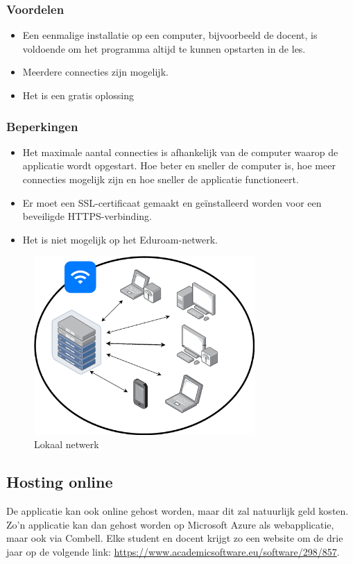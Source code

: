 \subsubsection{Voordelen}
\begin{itemize}
    \item Een eenmalige installatie op een computer, bijvoorbeeld de docent, is voldoende om het programma altijd te kunnen opstarten in de les.
    \item Meerdere connecties zijn mogelijk.
    \item Het is een gratis oplossing
\end{itemize}
\subsubsection{Beperkingen}
\begin{itemize}
    \item Het maximale aantal connecties is afhankelijk van de computer waarop de applicatie wordt opgestart. Hoe beter en sneller de computer is, hoe meer connecties mogelijk zijn en hoe sneller de applicatie functioneert.
    \item Er moet een SSL-certificaat gemaakt en geïnstalleerd worden voor een beveiligde HTTPS-verbinding.
    \item Het is niet mogelijk op het Eduroam-netwerk.
\end{itemize}

\begin{figure}
    \centering
    \includegraphics[width=0.75\textwidth]{./img/lokaal_netwerk}
    \caption{\label{fig:lokaal_netwerk} Lokaal netwerk}
\end{figure}

\subsection{Hosting online}
De applicatie kan ook online gehost worden, maar dit zal natuurlijk geld kosten. Zo'n applicatie kan dan gehost worden op Microsoft Azure als webapplicatie, maar ook via Combell. Elke student en docent krijgt zo een website om de drie jaar op de volgende link: \url{https://www.academicsoftware.eu/software/298/857}.

